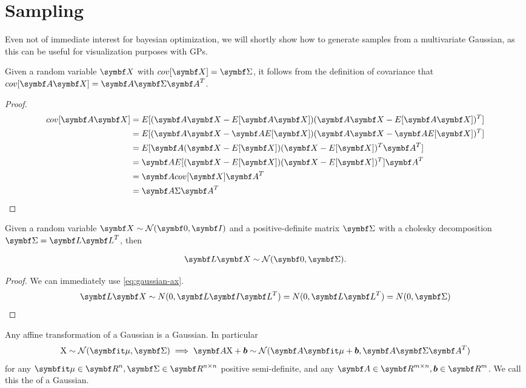 \section{Sampling}

Even not of immediate interest for bayesian optimization, we will shortly show
how to generate samples from a multivariate Gaussian, as this can be useful for
visualization purposes with GPs.

\begin{thm}
  Given a random variable $\mX$ with $cov[\mX] = \mSigma$, it follows from
  the definition of covariance that $cov[\mA \mX] = \mA \mSigma \mA^T$.
\end{thm}

\begin{proof}
  \begin{align}
    cov[\mA \mX] &= E[(\mA \mX - E[\mA \mX])(\mA \mX - E[\mA \mX])^T] \\
                 &= E[(\mA \mX - \mA E[\mX])(\mA \mX - \mA E[\mX])^T] \\
                 &= E[\mA (\mX - E[\mX])(\mX - E[\mX])^T \mA^T] \\
                 &= \mA E[(\mX - E[\mX])(\mX - E[\mX])^T] \mA^T \\
                 &= \mA cov[\mX] \mA^T \\
                 &= \mA \Sigma \mA^T
    \label{eq:gaussian-ax}
  \end{align}
\end{proof}

\begin{thm}
  Given a random variable $\mX \sim \gN(\mZero, \mI)$ and a positive-definite matrix
  $\mSigma$ with a cholesky decomposition $\mSigma = \mL \mL^T$, then

  \begin{equation}
    \mL \mX \sim \gN(\mZero, \mSigma).
    \label{eq:gaussian-cholesky}
  \end{equation}
\end{thm}

\begin{proof}
  We can immediately use \eqref{eq:gaussian-ax}.
  \begin{align}
    \mL \mX \sim N(0, \mL \mI \mL^T) = N(0, \mL \mL^T) = N(0, \mSigma)
  \end{align}
\end{proof}

\begin{thm}
  Any affine transformation of a Gaussian is a Gaussian. In particular
  $$
    \rX \sim \gN(\vmu, \mSigma) \implies \mA \rX + \vb \sim \gN(\mA \vmu + \vb, \mA \mSigma \mA^T)
  $$
  for any $\vmu \in \mR^n, \mSigma \in \mR^{n \times n}$ positive
  semi-definite, and any $\mA \in \mR^{m \times n}, \vb \in \mR^m$.
  We call this the  of a Gaussian.
\end{thm}

